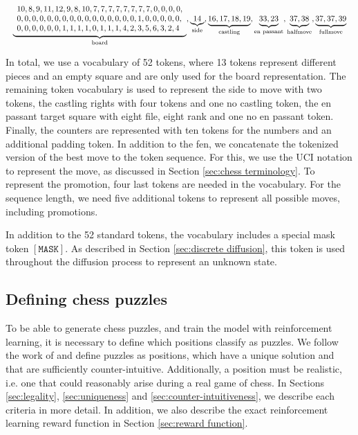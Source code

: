\begin{equation*}
    \resizebox{\textwidth}{!}{$
        \underbrace{
            \begin{array}{l}
                10, 8, 9, 11, 12, 9, 8, 10, 7, 7, 7, 7, 7, 7, 7, 7, 0, 0, 0, 0, \\
                0, 0, 0, 0, 0, 0, 0, 0, 0, 0, 0, 0, 0, 0, 0, 0, 1, 0, 0, 0, 0, 0, \\
                0, 0, 0, 0, 0, 0, 1, 1, 1, 1, 0, 1, 1, 1, 4, 2, 3, 5, 6, 3, 2, 4
            \end{array}
        }_{\text{board}}, \underbrace{14}_{\text{side}}, \underbrace{16, 17, 18, 19}_{\text{castling}}, \underbrace{33, 23}_{\text{en passant}}, \underbrace{37, 38}_{\text{halfmove}}, \underbrace{37, 37, 39}_{\text{fullmove}}
    $}
\end{equation*}

In total, we use a vocabulary of 52 tokens, where 13 tokens represent different pieces and an empty square and are only used for the board representation. The remaining token vocabulary is used to represent the side to move with two tokens, the castling rights with four tokens and one no castling token, the en passant target square with eight file, eight rank and one no en passant token. Finally, the counters are represented with ten tokens for the numbers and an additional padding token. In addition to the fen, we concatenate the tokenized version of the best move to the token sequence. For this, we use the UCI notation \cite{UCIchessinterface} to represent the move, as discussed in Section \ref{sec:chess terminology}. To represent the promotion, four last tokens are needed in the vocabulary. For the sequence length, we need five additional tokens to represent all possible moves, including promotions.

In addition to the 52 standard tokens, the vocabulary includes a special mask token $[\mathtt{MASK}]$. As described in Section \ref{sec:discrete diffusion}, this token is used throughout the diffusion process to represent an unknown state.


\subsection{Defining chess puzzles}
\label{sec:defining chess puzzles}
To be able to generate chess puzzles, and train the model with reinforcement learning, it is necessary to define which positions classify as puzzles. We follow the work of \citeauthor{feng2025generatingcreativechesspuzzles} and define puzzles as positions, which have a unique solution and that are sufficiently counter-intuitive. Additionally, a position must be realistic, i.e. one that could reasonably arise during a real game of chess. In Sections \ref{sec:legality}, \ref{sec:uniqueness} and \ref{sec:counter-intuitiveness}, we describe each criteria in more detail. In addition, we also describe the exact reinforcement learning reward function in Section \ref{sec:reward function}.


